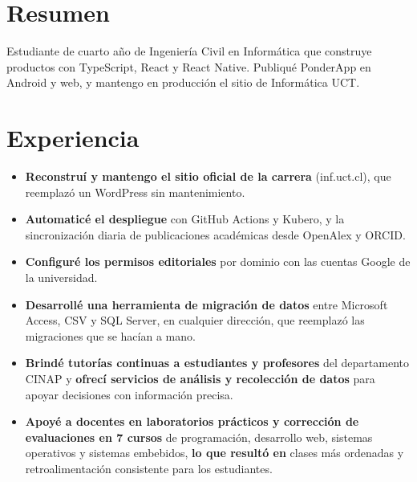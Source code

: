 \documentclass[spanish]{cv}
\begin{document}

\section{Resumen}
Estudiante de cuarto año de Ingeniería Civil en Informática que
construye productos con
TypeScript, React y React Native. Publiqué PonderApp en Android y
web, y mantengo en
producción el sitio de Informática UCT.

\section{Experiencia}
\begin{itemize}
  \item \textbf{Reconstruí y mantengo el sitio oficial de la carrera}
    (inf.uct.cl), que reemplazó un WordPress sin mantenimiento.
  \item \textbf{Automaticé el despliegue} con GitHub Actions y Kubero,
    y la sincronización diaria de publicaciones académicas desde
    OpenAlex y ORCID.
  \item \textbf{Configuré los permisos editoriales} por dominio con las
    cuentas Google de la universidad.
\end{itemize}
\begin{itemize}
  \item \textbf{Desarrollé una herramienta de migración de datos}
    entre Microsoft Access, CSV y SQL Server, en cualquier dirección,
    que reemplazó las migraciones que se hacían a mano.
\end{itemize}
\begin{itemize}
  \item \textbf{Brindé tutorías continuas a estudiantes y profesores}
    del departamento CINAP y \textbf{ofrecí servicios de análisis y
    recolección de datos} para apoyar decisiones con información precisa.
\end{itemize}
\begin{itemize}
  \item \textbf{Apoyé a docentes en laboratorios prácticos y
    corrección de evaluaciones en 7 cursos} de programación,
    desarrollo web, sistemas operativos y sistemas embebidos,
    \textbf{lo que resultó en} clases más ordenadas y
    retroalimentación consistente para los estudiantes.
\end{itemize}
\end{document}
